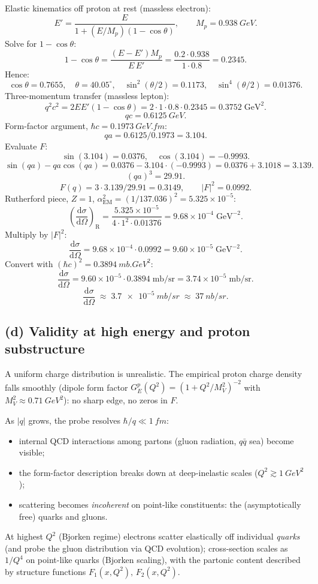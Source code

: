 \documentclass[11pt]{article}
\newcommand{\de}{\mathrm{d}}
\begin{document}
Elastic kinematics off proton at rest (massless electron):
\[
E' = \frac{E}{1+(E/M_p)(1-\cos\theta)},\qquad M_p=\SI{0.938}{GeV}.
\]
Solve for $1-\cos\theta$:
\[
1-\cos\theta = \frac{(E-E')M_p}{E\,E'} = \frac{0.2\cdot 0.938}{1\cdot 0.8} = 0.2345.
\]
Hence:
\[
\cos\theta = 0.7655,\quad \theta = 40.05^\circ,\quad \sin^2(\theta/2) = 0.1173,\quad \sin^4(\theta/2) = 0.01376.
\]
Three-momentum transfer (massless lepton):
\[
q^2 c^2 = 2EE'(1-\cos\theta) = 2\cdot 1\cdot 0.8\cdot 0.2345 = 0.3752\;\text{GeV}^2.
\]
\[
qc = \SI{0.6125}{GeV}.
\]
Form-factor argument, $\hbar c = \SI{0.1973}{GeV.fm}$:
\[
qa = 0.6125/0.1973 = 3.104.
\]
Evaluate $F$:
\[
\sin(3.104) = 0.0376,\quad \cos(3.104) = -0.9993.
\]
\[
\sin(qa)-qa\cos(qa) = 0.0376 - 3.104\cdot(-0.9993) = 0.0376 + 3.1018 = 3.139.
\]
\[
(qa)^3 = 29.91.
\]
\[
F(q) = 3\cdot 3.139/29.91 = 0.3149,\qquad |F|^2 = 0.0992.
\]
Rutherford piece, $Z=1$, $\alpha_\text{EM}^2 = (1/137.036)^2 = 5.325\times 10^{-5}$:
\[
\left(\frac{\de\sigma}{\de\Omega}\right)_\text{R} = \frac{5.325\times 10^{-5}}{4\cdot 1^2\cdot 0.01376} = 9.68\times 10^{-4}\;\text{GeV}^{-2}.
\]
Multiply by $|F|^2$:
\[
\frac{\de\sigma}{\de\Omega} = 9.68\times 10^{-4}\cdot 0.0992 = 9.60\times 10^{-5}\;\text{GeV}^{-2}.
\]
Convert with $(\hbar c)^2 = \SI{0.3894}{mb.GeV^2}$:
\[
\frac{\de\sigma}{\de\Omega} = 9.60\times 10^{-5}\cdot 0.3894\;\text{mb/sr} = 3.74\times 10^{-5}\;\text{mb/sr}.
\]
\[
\boxed{\;\frac{\de\sigma}{\de\Omega}\;\approx\;\SI{3.7e-5}{mb/sr}\;\approx\;\SI{37}{nb/sr}.\;}
\]

\subsection*{(d) Validity at high energy and proton substructure}

A uniform charge distribution is unrealistic. The empirical proton charge density falls smoothly (dipole form factor $G_E^p(Q^2) = (1+Q^2/M_V^2)^{-2}$ with $M_V^2\approx \SI{0.71}{GeV^2}$): no sharp edge, no zeros in $F$.

As $|q|$ grows, the probe resolves $\hbar/q\ll\SI{1}{fm}$:
\begin{itemize}\itemsep 0pt
\item internal QCD interactions among partons (gluon radiation, $q\bar q$ sea) become visible;
\item the form-factor description breaks down at deep-inelastic scales ($Q^2\gtrsim\SI{1}{GeV^2}$);
\item scattering becomes \emph{incoherent} on point-like constituents: the (asymptotically free) quarks and gluons.
\end{itemize}
At highest $Q^2$ (Bjorken regime) electrons scatter elastically off individual \emph{quarks} (and probe the gluon distribution via QCD evolution); cross-section scales as $1/Q^4$ on point-like quarks (Bjorken scaling), with the partonic content described by structure functions $F_1(x,Q^2),\,F_2(x,Q^2)$.
\end{document}

